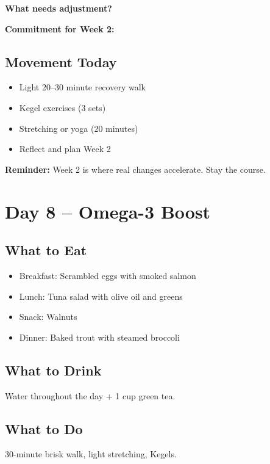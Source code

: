 \documentclass[11pt,oneside]{book}
\begin{document}
\vspace{2cm}

\textbf{What needs adjustment?}

\vspace{2cm}

\textbf{Commitment for Week 2:}

\vspace{2cm}

\section*{Movement Today}
\begin{itemize}[leftmargin=*]
\item Light 20--30 minute recovery walk
\item Kegel exercises (3 sets)
\item Stretching or yoga (20 minutes)
\item Reflect and plan Week 2
\end{itemize}

\textbf{Reminder:} Week 2 is where real changes accelerate. Stay the course.

\clearpage


\chapter*{Day 8 – Omega-3 Boost}

\section*{What to Eat}
\begin{itemize}[leftmargin=*]
\item Breakfast: Scrambled eggs with smoked salmon
\item Lunch: Tuna salad with olive oil and greens
\item Snack: Walnuts
\item Dinner: Baked trout with steamed broccoli
\end{itemize}

\section*{What to Drink}
Water throughout the day + 1 cup green tea.

\section*{What to Do}
30-minute brisk walk, light stretching, Kegels.
\end{document}
